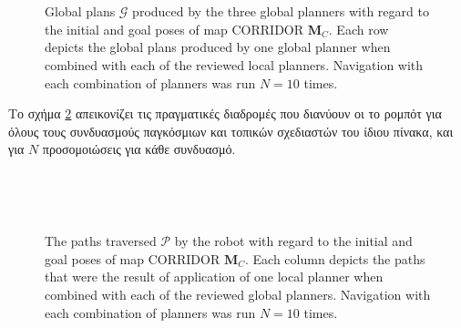 \begin{figure}\centering
  \begin{subfigure}[t]{\linewidth}
    \centering
    
  \end{subfigure}\\%
  \begin{subfigure}[t]{\linewidth}
    \centering
    
  \end{subfigure}\\%
  \begin{subfigure}[t]{\linewidth}
    \centering
    
  \end{subfigure}%
  \caption{Global plans $\bm{\mathcal{G}}$ produced by the three global
           planners with regard to the initial and goal poses of map
           CORRIDOR $\bm{M}_C$. Each row depicts the global plans produced
           by one global planner when combined with each of the reviewed local
           planners. Navigation with each combination of planners was run
           $N=10$ times.}
  \label{fig:global_plans:corridor}
\end{figure}

Το σχήμα \ref{fig:ground_truths:corridor} απεικονίζει τις πραγματικές διαδρομές που διανύουν οι
το ρομπότ για όλους τους συνδυασμούς παγκόσμιων και τοπικών σχεδιαστών του ίδιου πίνακα,
και για $N$ προσομοιώσεις για κάθε συνδυασμό.

\begin{figure}\centering
  \begin{subfigure}[t]{\linewidth}
    \centering
    
  \end{subfigure}\\%
  \begin{subfigure}[t]{\linewidth}
    \centering
    
  \end{subfigure}\\%
  \begin{subfigure}[t]{\linewidth}
    \centering
    
  \end{subfigure}%
  \caption{The paths traversed $\bm{\mathcal{P}}$ by the robot with regard to
           the initial and goal poses of map CORRIDOR $\bm{M}_C$. Each column
           depicts the paths that were the result of application of one local
           planner when combined with each of the reviewed global planners.
           Navigation with each combination of planners was run $N=10$ times.}
  \label{fig:ground_truths:corridor}
\end{figure}


